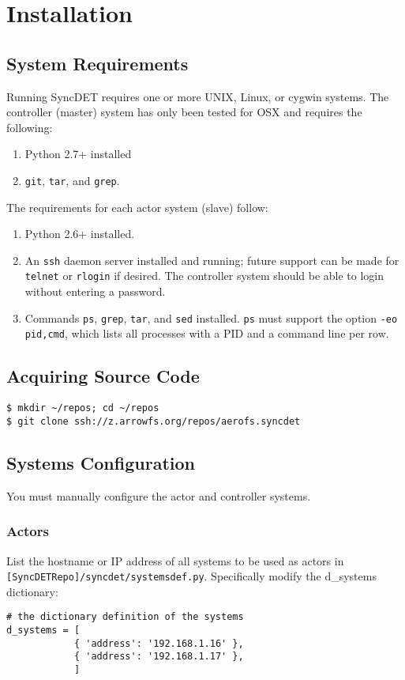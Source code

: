 \section{Installation}

\subsection{System Requirements}

Running SyncDET requires one or more UNIX, Linux, or cygwin systems. 
The controller (master) system has only been tested for OSX and requires the
following:
\begin{enumerate}
\item Python 2.7+ installed
\item {\tt git}, {\tt tar}, and {\tt grep}.
\end{enumerate}
The requirements for each actor system (slave) follow:
\begin{enumerate}
\item Python 2.6+ installed.
\item An {\tt ssh} daemon server installed and running; future support can be made for
{\tt telnet} or {\tt rlogin} if desired. The controller system should be able to login
without entering a password.
\item Commands {\tt ps}, {\tt grep}, {\tt tar}, and {\tt sed} installed. {\tt ps} must
support the option {\tt -eo pid,cmd}, which lists all processes with a PID and a
command line per row.
\end{enumerate}

\subsection{Acquiring Source Code}
\begin{verbatim}
$ mkdir ~/repos; cd ~/repos
$ git clone ssh://z.arrowfs.org/repos/aerofs.syncdet
\end{verbatim}

\subsection{Systems Configuration}
You must manually configure the actor and controller systems. 

\subsubsection{Actors} 
List the hostname or IP address of all systems to be used as actors in {\tt
[SyncDETRepo]/syncdet/systemsdef.py}. Specifically modify the d\_systems
dictionary:
\begin{verbatim}
# the dictionary definition of the systems
d_systems = [
            { 'address': '192.168.1.16' },
            { 'address': '192.168.1.17' },
            ]
\end{verbatim}

